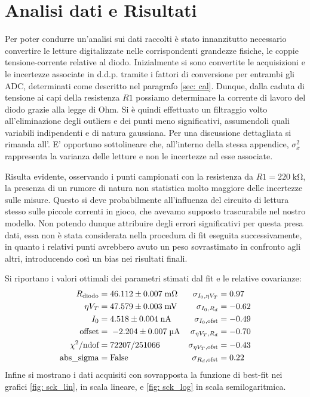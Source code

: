 \documentclass{article}[a4paper, oneside, 11pt]
\begin{document}
\section{Analisi dati e Risultati}
Per poter condurre un'analisi sui dati raccolti \`e stato innanzitutto
necessario convertire le letture digitalizzate nelle corrispondenti
grandezze fisiche, le coppie tensione-corrente relative al diodo.
Inizialmente si sono convertite le acquisizioni e le incertezze associate in
d.d.p. tramite i fattori di conversione per entrambi gli ADC,
determinati come descritto nel paragrafo \ref{sec: cal}.
Dunque, dalla caduta di tensione ai capi della resistenza $R1$ possiamo
determinare la corrente di lavoro del diodo grazie alla legge di Ohm. 
Si \`e quindi effettuato un filtraggio volto all'eliminazione degli outliers e 
dei punti meno significativi, assumendoli quali variabili indipendenti e di 
natura gaussiana. Per una discussione dettagliata si rimanda all'. E’ opportuno sottolineare che, all’interno della stessa appendice, 
$\sigma_x^2$ rappresenta la varianza delle letture e non le incertezze ad esse
associate.


Risulta evidente, osservando i punti campionati con la resistenza da
$R1 = 220 \; \si{\kohm}$, la presenza di un rumore di natura non statistica
molto maggiore delle incertezze sulle misure. 
Questo si deve probabilmente all'influenza del circuito di lettura
stesso sulle piccole correnti in gioco, che avevamo supposto trascurabile
nel nostro modello. Non potendo dunque attribuire degli errori significativi
per questa presa dati, essa non \`e stata considerata nella procedura di
fit eseguita successivamente, in quanto i relativi punti avrebbero avuto un
peso sovrastimato in confronto agli altri, introducendo cos\`i un bias
nei risultati finali.

Si riportano i valori ottimali dei parametri stimati dal fit e le relative
covarianze: 
\begin{align*}
R_{\text{diodo}} &= 46.112\iffalse 18 \fi \pm 0.007\iffalse 2 \fi \; \si{\mohm} 
&\sigma_{I_0, \eta V_T} &= 0.97  \\
\eta V_T &= 47.579\iffalse 86 \fi \pm 0.003\iffalse 3 \fi \; \si{\mV} 	
&\sigma_{I_0, R_d} &= -0.62 \\
I_0 &= 4.518\iffalse 0 \fi \pm 0.004\iffalse 3 \fi \; \si{\nA}
&\sigma_{I_0, \text{ofst}} &= -0.49 \\
\text{offset} &=\; - 2.204\iffalse 3 \fi \pm 0.007 \iffalse 3 \fi \; \si{\uA}
&\sigma_{\eta V_T, R_d} &= -0.70  \\ 
\chi^2/\text{ndof} &= 72207/251066
&\sigma_{\eta V_T, \text{ofst}} &= -0.43\\
\text{abs\_sigma} &= \rm False
&\sigma_{R_d, \text{ofst}} &= 0.22
\end{align*}
Infine si mostrano i dati acquisiti con sovrapposta la funzione di best-fit
nei grafici \ref{fig: sck_lin}, in scala lineare, e \ref{fig: sck_log}
in scala semilogaritmica. 
\end{document}
